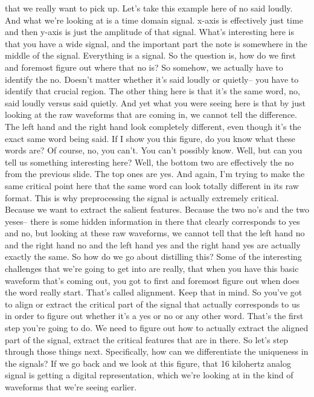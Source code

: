that we really want to pick up.
Let's take this example here of no said loudly.
And what we're looking at is a time domain signal.
x-axis is effectively just time and then y-axis is just
the amplitude of that signal.
What's interesting here is that you have a wide signal,
and the important part the note is somewhere in the middle of the signal.
Everything is a signal.
So the question is, how do we first and foremost figure out where that no is?
So somehow, we actually have to identify the no.
Doesn't matter whether it's said loudly or quietly--
you have to identify that crucial region.
The other thing here is that it's the same word, no,
said loudly versus said quietly.
And yet what you were seeing here is that by just looking at the raw
waveforms that are coming in, we cannot tell the difference.
The left hand and the right hand look completely different,
even though it's the exact same word being said.
If I show you this figure, do you know what these words are?
Of course, no, you can't.
You can't possibly know.
Well, but can you tell us something interesting here?
Well, the bottom two are effectively the no from the previous slide.
The top ones are yes.
And again, I'm trying to make the same critical point here
that the same word can look totally different in its raw format.
This is why preprocessing the signal is actually extremely critical.
Because we want to extract the salient features.
Because the two no's and the two yeses--
there is some hidden information in there that clearly corresponds to yes
and no, but looking at these raw waveforms,
we cannot tell that the left hand no and the right hand no and the left hand yes
and the right hand yes are actually exactly the same.
So how do we go about distilling this?
Some of the interesting challenges that we're going to get into
are really, that when you have this basic waveform that's coming out,
you got to first and foremost figure out when does the word really start.
That's called alignment.
Keep that in mind.
So you've got to align or extract the critical part of the signal that
actually corresponds to us in order to figure out whether it's
a yes or no or any other word.
That's the first step you're going to do.
We need to figure out how to actually extract the aligned part of the signal,
extract the critical features that are in there.
So let's step through those things next.
Specifically, how can we differentiate the uniqueness in the signals?
If we go back and we look at this figure,
that 16 kilohertz analog signal is getting a digital representation,
which we're looking at in the kind of waveforms that we're seeing earlier.
